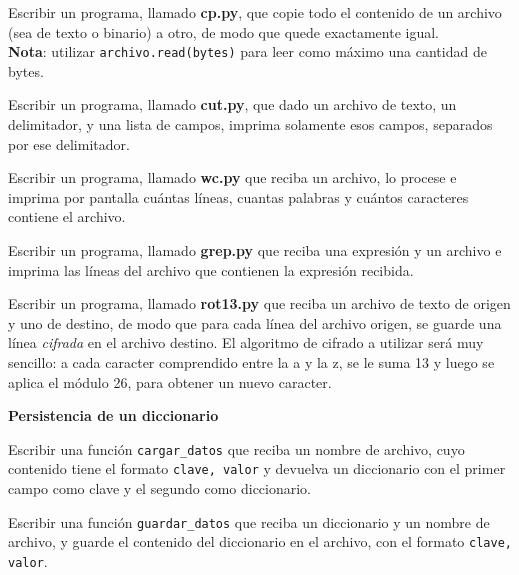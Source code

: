 \begin{ejercicio}
Escribir un programa, llamado {\bf cp.py}, que copie todo el contenido de un
archivo (sea de texto o binario) a otro, de modo que quede exactamente igual.\\
{\bf Nota}: utilizar \lstinline!archivo.read(bytes)! para leer como máximo
una cantidad de bytes.
\end{ejercicio}

\begin{ejercicio}
Escribir un programa, llamado {\bf cut.py}, que dado un archivo de texto, un
delimitador, y una lista de campos, imprima solamente esos campos, separados
por ese delimitador.
\end{ejercicio}

\begin{ejercicio}
Escribir un programa, llamado {\bf wc.py} que reciba un archivo, lo procese e
imprima por pantalla cuántas líneas, cuantas palabras y cuántos caracteres
contiene el archivo.
\end{ejercicio}

\begin{ejercicio}
Escribir un programa, llamado {\bf grep.py} que reciba una expresión y un
archivo e imprima las líneas del archivo que contienen la expresión recibida.
\end{ejercicio}

\begin{ejercicio}
Escribir un programa, llamado {\bf rot13.py} que reciba un archivo de texto de
origen y uno de destino, de modo que para cada línea del archivo origen, se
guarde una línea \emph{cifrada} en el archivo destino.  El algoritmo de cifrado
a utilizar será muy sencillo: a cada caracter comprendido entre la a y la z, se
le suma 13 y luego se aplica el módulo 26, para obtener un nuevo caracter.
\end{ejercicio}

\begin{ejercicio} {\bf Persistencia de un diccionario}
\begin{partes}
  \item Escribir una función \lstinline!cargar_datos! que reciba un nombre de
archivo, cuyo contenido tiene el formato \lstinline!clave, valor! y devuelva un
diccionario con el primer campo como clave y el segundo como diccionario.
  \item Escribir una función \lstinline!guardar_datos! que reciba un diccionario
y un nombre de archivo, y guarde el contenido del diccionario en el archivo,
con el formato \lstinline!clave, valor!.
\end{partes}
\end{ejercicio}

